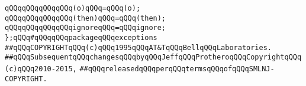 \newline
\verb|qQQqqQQqqQQqqQQq(o)qQQq=qQQq(o);|\newline
\newline
\verb|qQQqqQQqqQQqqQQq(then)qQQq=qQQq(then);|\newline
\newline
\verb|qQQqqQQqqQQqqQQqignoreqQQq=qQQqignore;|\newline
\newline
\verb|};qQQq#qQQqqQQqpackageqQQqexceptions|\newline
\newline
\newline
\newline
\verb|##qQQqCOPYRIGHTqQQq(c)qQQq1995qQQqAT&TqQQqBellqQQqLaboratories.|\newline
\verb|##qQQqSubsequentqQQqchangesqQQqbyqQQqJeffqQQqProtheroqQQqCopyrightqQQq(c)qQQq2010-2015,|\newline
\verb|##qQQqreleasedqQQqperqQQqtermsqQQqofqQQqSMLNJ-COPYRIGHT.|\newline


